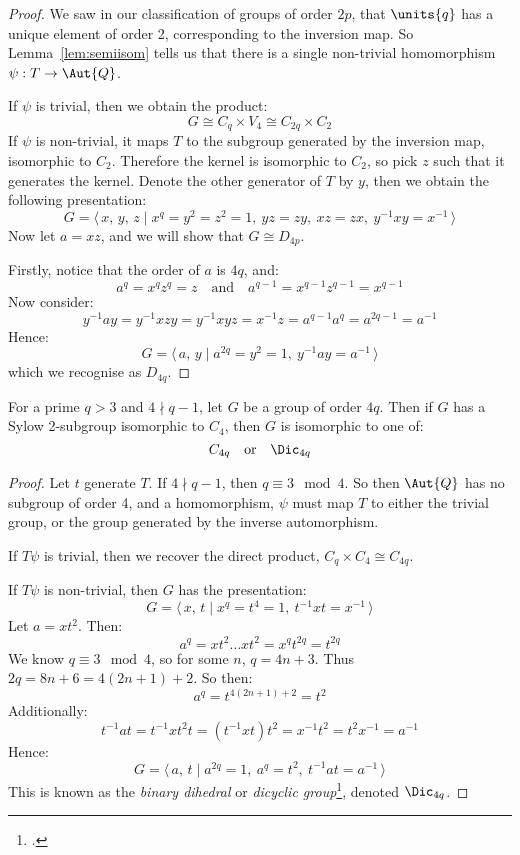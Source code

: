 \begin{proof}
    We saw in our classification of groups of order \(2p\), that \(\units{q}\) has a unique element of order 2,
    corresponding to the inversion map.
    So Lemma~\ref{lem:semiisom} tells us that there is a single non-trivial homomorphism \(\psi:T \to \Aut{Q}\).

    If \(\psi\) is trivial, then we obtain the product:
    \[G \cong C_q \times V_4 \cong C_{2q} \times C_2\]
    If \(\psi\) is non-trivial, it maps \(T\) to the subgroup generated by the inversion map, isomorphic to \(C_2\).
    Therefore the kernel is isomorphic to \(C_2\), so pick \(z\) such that it generates the kernel.
    Denote the other generator of \(T\) by \(y\), then we obtain the following presentation:
    \[G = \langle\, x,\,y,\,z \mid x^q = y^2 = z^2 = 1,\ yz = zy,\ xz = zx,\ y^{-1}xy = x^{-1}\,\rangle\]
    Now let \(a = xz\), and we will show that \(G \cong D_{4p}\).

    Firstly, notice that the order of \(a\) is \(4q\), and:
    \[a^q = x^q z^q = z \quad \text{and} \quad a^{q-1} = x^{q-1} z^{q-1} = x^{q-1}\]
    Now consider:
    \[y^{-1}ay = y^{-1}xzy = y^{-1}xyz = x^{-1}z = a^{q-1} a^q = a^{2q-1} = a^{-1}\]
    Hence:
    \[G = \langle\, a,\,y \mid a^{2q} = y^2 = 1,\ y^{-1}ay = a^{-1}\,\rangle\]
    which we recognise as \(D_{4q}\).
\end{proof}

\begin{lemma}
    For a prime \(q > 3\) and \(4 \nmid q-1\), let \(G\) be a group of order \(4q\).
    Then if \(G\) has a Sylow 2-subgroup isomorphic to \(C_{4}\), then \(G\) is isomorphic to one of:
    \[%
        C_{4q} \quad \text{or} \quad%
        \Dic_{4q}
    \]
\end{lemma}

\begin{proof}
    Let \(t\) generate \(T\).
    If \(4 \nmid q-1\), then \(q \equiv 3 \mod{4}\).
    So then \(\Aut{Q}\) has no subgroup of order 4, and a homomorphism, \(\psi\) must map \(T\) to either the
    trivial group, or the group generated by the inverse automorphism.

    If \(T\psi\) is trivial, then we recover the direct product, \(C_q \times C_4 \cong C_{4q}\).

    If \(T\psi\) is non-trivial, then \(G\) has the presentation:
    \[G = \langle\, x,\,t \mid x^q = t^4 = 1,\ t^{-1}xt = x^{-1}\,\rangle\]
    Let \(a = xt^2\).
    Then:
    \[a^q = xt^2\dots xt^2 = x^q t^{2q} = t^{2q}\]
    We know \(q \equiv 3 \mod{4}\), so for some \(n\), \(q = 4n + 3\).
    Thus \(2q = 8n + 6 = 4(2n + 1) + 2\).
    So then:
    \[a^q = t^{4(2n + 1) + 2} = t^2\]
    Additionally:
    \[t^{-1}at = t^{-1}xt^2t = (t^{-1}xt)t^2 = x^{-1}t^2 = t^2 x^{-1} = a^{-1}\]
    Hence:
    \[G = \langle\, a,\,t \mid a^{2q} = 1,\ a^q = t^2,\ t^{-1}at = a^{-1}\,\rangle\]
    This is known as the \emph{binary dihedral} or \emph{dicyclic group}\footcite{dicyclic}, denoted \(\Dic_{4q}\).
\end{proof}

